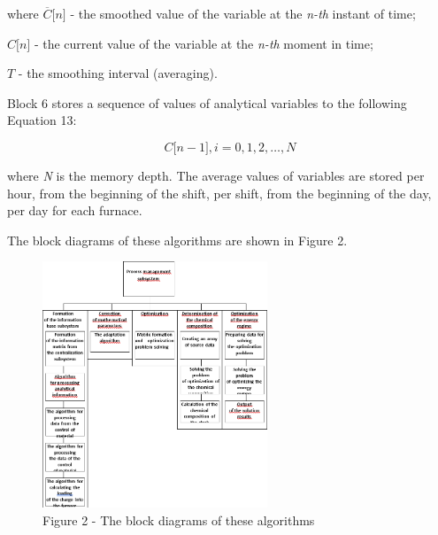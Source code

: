 where \(\overline{C}\lbrack n\rbrack\) - the smoothed value of the
variable at the \emph{n-th} instant of time;

\(C\lbrack n\rbrack\) - the current value of the variable at the
\emph{n-th} moment in time;

\(T\) - the smoothing interval (averaging).

Block 6 stores a sequence of values of analytical variables to the
following Equation 13:

\begin{equation}
C\lbrack n - 1\rbrack, i = 0,1,2,\ldots,N
\end{equation}

where \emph{N} is the memory depth. The average values of variables are
stored per hour, from the beginning of the shift, per shift, from the
beginning of the day, per day for each furnace.

The block diagrams of these algorithms are shown in Figure 2.

\begin{figure}[H]
	\centering
	\includegraphics[width=0.6\textwidth]{assets/9}
	\caption*{Figure 2 - The block diagrams of these algorithms}
\end{figure}

